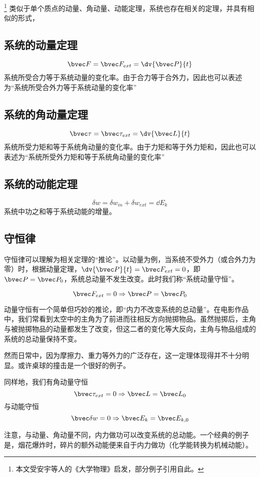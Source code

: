 \footnote{本文受安宇等人的《大学物理》启发，部分例子引用自此。}
类似于单个质点的动量、角动量、动能定理，系统也存在相关的定理，并具有相似的形式，

\subsection{系统的动量定理}
\begin{equation}
\bvec F = \bvec F_{ext} = \dv{\bvec P}{t}
\end{equation}
系统所受合力等于系统动量的变化率。由于合力等于合外力，因此也可以表述为“系统所受合外力等于系统动量的变化率”

\subsection{系统的角动量定理}
\begin{equation}
\bvec \tau = \bvec \tau_{ext} = \dv{\bvec L}{t}
\end{equation}
系统所受力矩和等于系统角动量的变化率。由于力矩和等于外力矩和，因此也可以表述为“系统所受外力矩和等于系统角动量的变化率”

\subsection{系统的动能定理}
\begin{equation}
\delta w =\delta w_{in} + \delta w_{ext} = \dd E_k
\end{equation}
系统中功之和等于系统动能的增量。

\subsection{守恒律}
守恒律可以理解为相关定理的“推论”。以动量为例，当系统不受外力（或合外力为零）时，根据动量定理，$\dv{\bvec P}{t} = \bvec F_{ext}=0$，即$\bvec P = \bvec P_0$，系统总动量不发生改变。此时我们称“系统动量守恒”。

\begin{equation}
\bvec F_{ext} = 0 \Rightarrow \bvec P = \bvec P_0
\end{equation}

动量守恒有一个简单但巧妙的推论，即“内力不改变系统的总动量”。在电影作品中，我们常看到太空中的主角为了前进而往相反方向抛掷物品。虽然抛掷后，主角与被抛掷物品的动量都发生了改变，但这二者的变化等大反向，主角与物品组成的系统的总动量保持不变。

然而日常中，因为摩擦力、重力等外力的广泛存在，这一定理体现得并不十分明显。或许桌球的撞击是一个很好的例子。

同样地，我们有角动量守恒
\begin{equation}
\bvec \tau_{ext} = 0 \Rightarrow \bvec L = \bvec L_0
\end{equation}
与动能守恒
\begin{equation}
\bvec \delta w = 0 \Rightarrow \bvec E_k = \bvec E_{k,0}
\end{equation}

注意，与动量、角动量不同，内力做功可以改变系统的总动能。一个经典的例子是，烟花爆炸时，碎片的额外动能便来自于内力做功（化学能转换为机械动能）。
